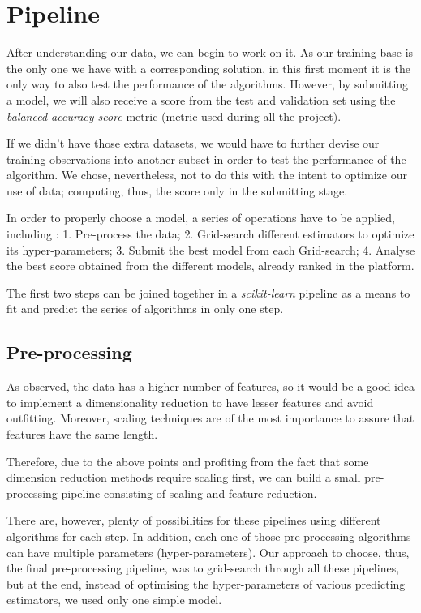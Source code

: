 \documentclass[letterpaper,11pt]{article}
\begin{document}
\section{Pipeline}

After understanding our data, we can begin to work on it. As our training base is the only one we have with a corresponding solution, in this first moment it is the only way to also test the performance of the algorithms. However, by submitting a model, we will also receive a score from the test and validation set using the \textit{balanced accuracy score} metric (metric used during all the project).

If we didn't have those extra datasets, we would have to further devise our training observations into another subset in order to test the performance of the algorithm. We chose, nevertheless, not to do this with the intent to optimize our use of data; computing, thus, the score only in the submitting stage.

In order to properly choose a model, a series of operations have to be applied, including : 1. Pre-process the data;
2. Grid-search different estimators to optimize its hyper-parameters; 3. Submit the best model from each Grid-search;
4. Analyse the best score obtained from the different models, already ranked in the platform.

The first two steps can be joined together in a \textit{scikit-learn} pipeline as a means to fit and predict the series of algorithms in only one step.

\subsection{Pre-processing}
As observed, the data has a higher number of features, so it would be a good idea to implement a dimensionality reduction to have lesser features and avoid outfitting. Moreover, scaling techniques are of the most importance to assure that features have the same length.

Therefore, due to the above points and profiting from the fact that some dimension reduction methods require scaling first, we can build a small pre-processing pipeline consisting of scaling and feature reduction.

There are, however, plenty of possibilities for these pipelines using different algorithms for each step. In addition, each one of those pre-processing algorithms can have multiple parameters (hyper-parameters). Our approach to choose, thus, the final pre-processing pipeline, was to grid-search through all these pipelines, but at the end, instead of optimising the hyper-parameters of various predicting estimators, we used only one simple model.
\end{document}
